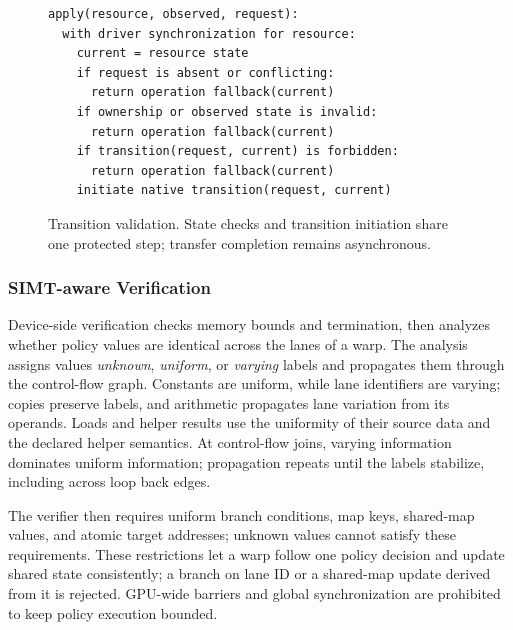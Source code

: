 \begin{figure}[t]
\begin{minipage}{\columnwidth}
\begin{lstlisting}[language={},xleftmargin=0pt,numbers=none,columns=fullflexible,keepspaces=true]
apply(resource, observed, request):
  with driver synchronization for resource:
    current = resource state
    if request is absent or conflicting:
      return operation fallback(current)
    if ownership or observed state is invalid:
      return operation fallback(current)
    if transition(request, current) is forbidden:
      return operation fallback(current)
    initiate native transition(request, current)
\end{lstlisting}
\caption{Transition validation. State checks and transition initiation share one protected step; transfer completion remains asynchronous.}
\label{fig:transition-validation}
\end{minipage}
\end{figure}

\subsubsection{SIMT-aware Verification}

Device-side verification checks memory bounds and termination, then analyzes whether policy values are identical across the lanes of a warp.
The analysis assigns values \emph{unknown}, \emph{uniform}, or \emph{varying} labels and propagates them through the control-flow graph.
Constants are uniform, while lane identifiers are varying; copies preserve labels, and arithmetic propagates lane variation from its operands.
Loads and helper results use the uniformity of their source data and the declared helper semantics.
At control-flow joins, varying information dominates uniform information; propagation repeats until the labels stabilize, including across loop back edges.

The verifier then requires uniform branch conditions, map keys, shared-map values, and atomic target addresses; unknown values cannot satisfy these requirements.
These restrictions let a warp follow one policy decision and update shared state consistently; a branch on lane ID or a shared-map update derived from it is rejected.
GPU-wide barriers and global synchronization are prohibited to keep policy execution bounded.

